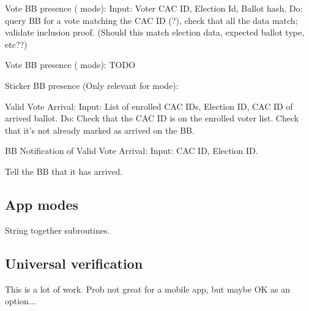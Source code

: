 \documentclass{article}
\begin{document}
Vote BB presence (\BBInclusionCheck{} mode):
   Input: Voter CAC ID, Election Id, Ballot hash,
    Do: query BB for a vote matching the CAC ID (?), check that all the data match; validate inclusion proof.  (Should this match election data, expected ballot type, etc??)


Vote BB presence (\StickerBBUpload{} mode):
TODO

Sticker BB presence (Only relevant for \StickerBBUpload mode):


Valid Vote Arrival:
Input: List of enrolled CAC IDs, Election ID, CAC ID of arrived ballot.
Do: Check that the CAC ID is on the enrolled voter list.
Check that it's not already marked as arrived on the BB.

BB Notification of Valid Vote Arrival:
Input: CAC ID, Election ID.

Tell the BB that it has arrived.

\subsection{App modes}
String together subroutines.

    \subsection{Universal verification}
    This is a lot of work. Prob not great for a mobile app, but maybe OK as an option...
\end{document}
